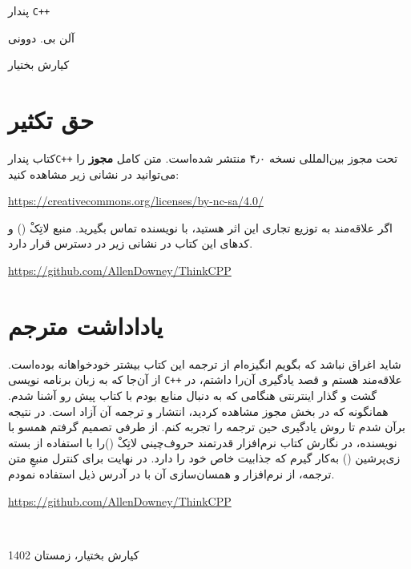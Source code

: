 \documentclass{book}
\begin{document}
\thispagestyle{empty}
\begin{titlepage}
 \vspace*{1cm}
 
 
 {\huge\raggedleft پندار \texttt{C++} \par}
 \noindent\hrulefill\par
 {\LARGE\raggedright آلن بی. دوونی\par}
 \vfill
 {\small\raggedright کیارش بختیار\par}
 \setcounter{page}{0}
\end{titlepage}


\section{حق تکثیر}
کتاب پندار\texttt{C++}  تحت مجوز بین‌المللی    نسخه ۴٫۰ منتشر شده‌است. 
متن کامل \textbf{مجوز} را می‌توانید در نشانی زیر مشاهده کنید:

\begin{latin}
\url{https://creativecommons.org/licenses/by-nc-sa/4.0/}
\end{latin}
اگر علاقه‌مند به توزیع تجاری این اثر هستید، با نویسنده تماس بگیرید. 
منبع لاتِکْ (\lr{\LaTeX}) و کدهای این کتاب در نشانی زیر در دسترس قرار دارد.
\begin{latin}
	\url{https://github.com/AllenDowney/ThinkCPP}
\end{latin}

\newpage

\section{یاداداشت مترجم}
شاید اغراق نباشد که بگویم انگیزه‌ام از ترجمه این کتاب بیشتر خودخواهانه بوده‌است. از آن‌جا که به زبان برنامه نویسی \texttt{C++}  علاقه‌مند هستم و قصد یادگیری آن‌را داشتم، در گشت و گذار اینترنتی هنگامی که به دنبال منابع بودم  با کتاب پیش رو آشنا شدم. همانگونه که در بخش مجوز مشاهده کردید، انتشار و ترجمه آن آزاد است. در نتیجه برآن شدم تا روش یادگیری حین ترجمه را تجربه کنم. از طرفی تصمیم گرفتم همسو با نویسنده، در نگارش کتاب نرم‌افزار قدرتمند حروف‌چینی لاتِکْ (\lr{\LaTeX})را با استفاده از بسته زی‌پرشین  (\lr{\XePersian}) به‌کار گیرم که جذابیت خاص خود را دارد. در نهایت برای کنترل منبعِ متن ترجمه، از نرم‌افزار  و همسان‌سازی آن با  در آدرس ذیل استفاده نمودم.


\begin{latin}
	\url{https://github.com/AllenDowney/ThinkCPP}
	\
	
\end{latin}




\
\begin{flushleft}
	کیارش بختیار، زمستان 1402
	
\end{flushleft}


\frontmatter
\tableofcontents

\mainmatter


\appendix


\printindex
\end{document}
